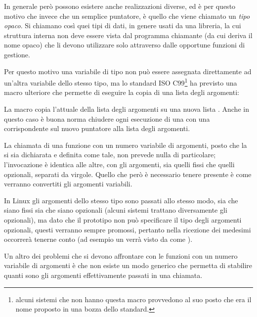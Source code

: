 
In generale però possono esistere anche realizzazioni diverse, ed è per questo
motivo che invece che un semplice puntatore,  è quello che
viene chiamato un \textsl{tipo opaco}. Si chiamano così quei tipi di dati, in
genere usati da una libreria, la cui struttura interna non deve essere vista
dal programma chiamante (da cui deriva il nome opaco) che li devono utilizzare
solo attraverso dalle opportune funzioni di gestione.


Per questo motivo una variabile di tipo  non può essere
assegnata direttamente ad un'altra variabile dello stesso tipo, ma lo standard
ISO C99\footnote{alcuni sistemi che non hanno questa macro provvedono al suo
  posto  che era il nome proposto in una bozza dello
  standard.}  ha previsto una macro ulteriore che permette di eseguire la
copia di una lista degli argomenti:

{\centering
\begin{funcbox}{ 
}
\end{funcbox}}

La macro copia l'attuale della lista degli argomenti  su una nuova
lista . Anche in questo caso è buona norma chiudere ogni
esecuzione di una  con una corrispondente  sul
nuovo puntatore alla lista degli argomenti.

La chiamata di una funzione con un numero variabile di argomenti, posto che la
si sia dichiarata e definita come tale, non prevede nulla di particolare;
l'invocazione è identica alle altre, con gli argomenti, sia quelli fissi che
quelli opzionali, separati da virgole. Quello che però è necessario tenere
presente è come verranno convertiti gli argomenti variabili.

In Linux gli argomenti dello stesso tipo sono passati allo stesso modo, sia
che siano fissi sia che siano opzionali (alcuni sistemi trattano diversamente
gli opzionali), ma dato che il prototipo non può specificare il tipo degli
argomenti opzionali, questi verranno sempre promossi, pertanto nella ricezione
dei medesimi occorrerà tenerne conto (ad esempio un  verrà visto da
 come ).

Un altro dei problemi che si devono affrontare con le funzioni con un numero
variabile di argomenti è che non esiste un modo generico che permetta di
stabilire quanti sono gli argomenti effettivamente passati in una chiamata.

